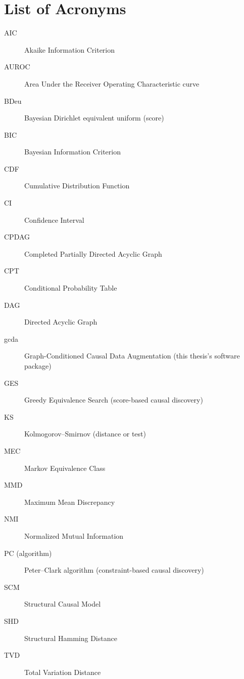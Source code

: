 \documentclass[
  english,
  class=report,
  accentcolor=2c,
  marginpar=false,
  parskip=half-,
  fontsize=11pt,
  ruledheaders=false,
  pdfa=false,
  IMRAD=false,
  thesis={type=master}
]{tudapub}
\begin{document}
\chapter*{List of Acronyms}
\begin{description}
  \item[AIC] Akaike Information Criterion
  \item[AUROC] Area Under the Receiver Operating Characteristic curve
  \item[BDeu] Bayesian Dirichlet equivalent uniform (score)
  \item[BIC] Bayesian Information Criterion
  \item[CDF] Cumulative Distribution Function
  \item[CI] Confidence Interval
  \item[CPDAG] Completed Partially Directed Acyclic Graph
  \item[CPT] Conditional Probability Table
  \item[DAG] Directed Acyclic Graph
  \item[gcda] Graph-Conditioned Causal Data Augmentation (this thesis's software package)
  \item[GES] Greedy Equivalence Search (score-based causal discovery)
  \item[KS] Kolmogorov--Smirnov (distance or test)
  \item[MEC] Markov Equivalence Class
  \item[MMD] Maximum Mean Discrepancy
  \item[NMI] Normalized Mutual Information
  \item[PC (algorithm)] Peter--Clark algorithm (constraint-based causal discovery)
  \item[SCM] Structural Causal Model
  \item[SHD] Structural Hamming Distance
  \item[TVD] Total Variation Distance
\end{description}
\end{document}
